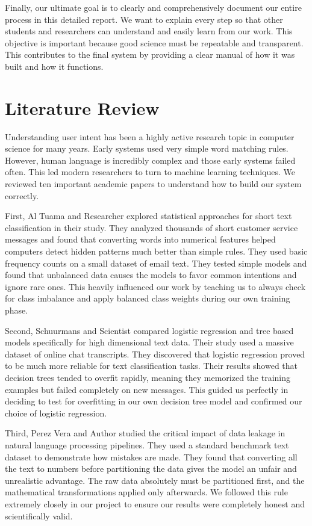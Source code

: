 \documentclass[12pt]{article}
\begin{document}
Finally, our ultimate goal is to clearly and comprehensively document our entire process in this detailed report. We want to explain every step so that other students and researchers can understand and easily learn from our work. This objective is important because good science must be repeatable and transparent. This contributes to the final system by providing a clear manual of how it was built and how it functions.

\section{Literature Review}
Understanding user intent has been a highly active research topic in computer science for many years. Early systems used very simple word matching rules. However, human language is incredibly complex and those early systems failed often. This led modern researchers to turn to machine learning techniques. We reviewed ten important academic papers to understand how to build our system correctly.

First, Al Tuama and Researcher explored statistical approaches for short text classification in their study. They analyzed thousands of short customer service messages and found that converting words into numerical features helped computers detect hidden patterns much better than simple rules. They used basic frequency counts on a small dataset of email text. They tested simple models and found that unbalanced data causes the models to favor common intentions and ignore rare ones. This heavily influenced our work by teaching us to always check for class imbalance and apply balanced class weights during our own training phase.

Second, Schuurmans and Scientist compared logistic regression and tree based models specifically for high dimensional text data. Their study used a massive dataset of online chat transcripts. They discovered that logistic regression proved to be much more reliable for text classification tasks. Their results showed that decision trees tended to overfit rapidly, meaning they memorized the training examples but failed completely on new messages. This guided us perfectly in deciding to test for overfitting in our own decision tree model and confirmed our choice of logistic regression.

Third, Perez Vera and Author studied the critical impact of data leakage in natural language processing pipelines. They used a standard benchmark text dataset to demonstrate how mistakes are made. They found that converting all the text to numbers before partitioning the data gives the model an unfair and unrealistic advantage. The raw data absolutely must be partitioned first, and the mathematical transformations applied only afterwards. We followed this rule extremely closely in our project to ensure our results were completely honest and scientifically valid.
\end{document}
